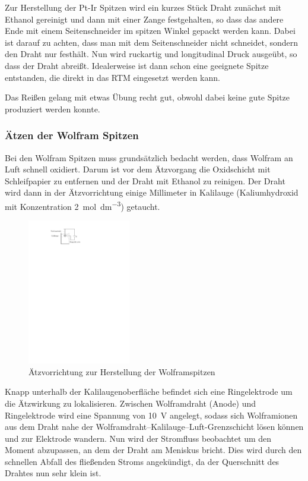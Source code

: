 \documentclass[10pt, a4paper]{article}
\begin{document}
Zur Herstellung der Pt-Ir Spitzen wird ein kurzes Stück Draht zunächst mit Ethanol gereinigt und dann mit einer Zange festgehalten, so dass das andere Ende mit einem Seitenschneider im spitzen Winkel gepackt werden kann.
Dabei ist darauf zu achten, dass man mit dem Seitenschneider nicht schneidet, sondern den Draht nur festhält.
Nun wird ruckartig und longitudinal Druck ausgeübt, so dass der Draht abreißt. Idealerweise ist dann schon eine geeignete Spitze entstanden, die direkt in das RTM eingesetzt werden kann.

Das Reißen gelang mit etwas Übung recht gut, obwohl dabei keine gute Spitze produziert werden konnte.

\subsubsection{Ätzen der Wolfram Spitzen}
Bei den Wolfram Spitzen muss grundsätzlich bedacht werden, dass Wolfram an Luft schnell oxidiert. 
Darum ist vor dem Ätzvorgang die Oxidschicht mit Schleifpapier zu entfernen und  der Draht mit Ethanol zu reinigen.
Der Draht wird dann in der Ätzvorrichtung einige Millimeter in Kalilauge (Kaliumhydroxid mit Konzentration \SI{2}{\mol\per\cubic\deci\metre}) getaucht.
\begin{figure}[h]
\centering
\includegraphics[width=0.4\textwidth]{./grafiken/aetzvorrichtung.pdf}
\caption{Ätzvorrichtung zur Herstellung der Wolframspitzen}
\label{fig:aetzen}
\end{figure}
Knapp unterhalb der Kalilaugenoberfläche befindet sich eine Ringelektrode um die Ätzwirkung zu lokalisieren.
Zwischen Wolframdraht (Anode) und Ringelektrode wird eine Spannung von \SI{10}{\volt} angelegt, sodass sich Wolframionen aus dem Draht nahe der Wolframdraht--Kalilauge--Luft-Grenzschicht lösen können und zur Elektrode wandern.
Nun wird der Stromfluss beobachtet um den Moment abzupassen, an dem der Draht am Meniskus bricht.
Dies wird durch den schnellen Abfall des fließenden Stroms angekündigt, da der Querschnitt des Drahtes nun sehr klein ist.
\end{document}
